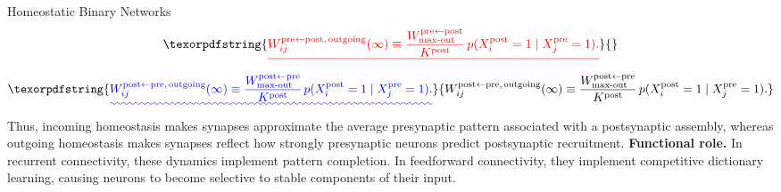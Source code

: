 \documentclass{article}
\providecommand{\DIFaddtex}[1]{{\protect\color{blue}\uwave{#1}}} %
\providecommand{\DIFdeltex}[1]{{\protect\color{red}\sout{#1}}}                      %
\providecommand{\DIFaddbegin}{} %
\providecommand{\DIFaddend}{} %
\providecommand{\DIFdelbegin}{} %
\providecommand{\DIFdelend}{} %
\providecommand{\DIFadd}[1]{\texorpdfstring{\DIFaddtex{#1}}{#1}} %
\providecommand{\DIFdel}[1]{\texorpdfstring{\DIFdeltex{#1}}{}} %
\begin{document}
\begin{technicalbox}{Homeostatic Binary Networks}
\[{}\]\DIFaddend 
\DIFdelbegin \[
\DIFdel{W_{ij}^{\mathrm{pre}\leftarrow\mathrm{post},\,\mathrm{outgoing}}(\infty)
\equiv
\frac{W_{\mathrm{max\text{-}out}}^{\mathrm{pre}\leftarrow\mathrm{post}}}{K^\mathrm{post}}
\,p(X_i^\mathrm{post}=1\mid X_j^\mathrm{pre}=1).
}\]%
\DIFdelend \DIFaddbegin \[
\DIFadd{W_{ij}^{\mathrm{post}\leftarrow\mathrm{pre},\,\mathrm{outgoing}}(\infty)
\equiv
\frac{W_{\mathrm{max\text{-}out}}^{\mathrm{post}\leftarrow\mathrm{pre}}}{K^\mathrm{post}}
\,p(X_i^\mathrm{post}=1\mid X_j^\mathrm{pre}=1).
}\]\DIFaddend 
Thus, incoming homeostasis makes synapses approximate the average presynaptic pattern associated with a postsynaptic assembly, whereas outgoing homeostasis makes synapses reflect how strongly presynaptic neurons predict postsynaptic recruitment.
\newline\newline
\textbf{Functional role.} In recurrent connectivity, these dynamics implement pattern completion. In feedforward connectivity, they implement competitive dictionary learning, causing neurons to become selective to stable components of their input.
\end{technicalbox}
\end{document}
